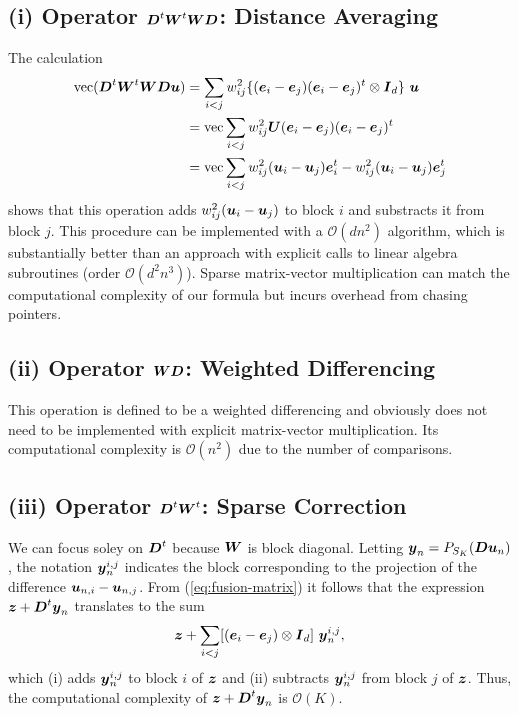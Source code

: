 \documentclass[11pt]{article}
\begin{document}
\subsection*{(i) Operator \(\boldsymbol{D}^{t} \boldsymbol{W}^{t} \boldsymbol{W} \boldsymbol{D}\): Distance Averaging}

The calculation
\begin{align*}
    \mathop{\rm vec}\nolimits(\boldsymbol{D}^{t} \boldsymbol{W}^{t} \boldsymbol{W} \boldsymbol{D} \boldsymbol{u})
    &=
    \sum_{i<j} w_{ij}^{2} \{(\boldsymbol{e}_{i} - \boldsymbol{e}_{j})(\boldsymbol{e}_{i} - \boldsymbol{e}_{j})^{t} \otimes \boldsymbol{I}_{d}\}~\boldsymbol{u} \\
    &=
    \mathop{\rm vec}\nolimits
    \sum_{i<j} w_{ij}^{2} \boldsymbol{U} (\boldsymbol{e}_{i} - \boldsymbol{e}_{j})(\boldsymbol{e}_{i} - \boldsymbol{e}_{j})^{t} \\
    &=
    \mathop{\rm vec}\nolimits
    \sum_{i<j} w_{ij}^{2} (\boldsymbol{u}_{i} - \boldsymbol{u}_{j}) \boldsymbol{e}_{i}^{t} - w_{ij}^{2} (\boldsymbol{u}_{i} - \boldsymbol{u}_{j}) \boldsymbol{e}_{j}^{t}
\end{align*}
shows that this operation adds \(w_{ij}^{2} (\boldsymbol{u}_{i} - \boldsymbol{u}_{j})\) to block \(i\) and substracts it from block \(j\).
This procedure can be implemented with a \(\mathcal{O}(dn^{2})\) algorithm, which is substantially better than an approach with explicit calls to linear algebra subroutines (order \(\mathcal{O}(d^{2}n^{3})\)).
Sparse matrix-vector multiplication can match the computational complexity of our formula but incurs overhead from chasing pointers.

\subsection*{(ii) Operator \(\boldsymbol{W} \boldsymbol{D}\): Weighted Differencing}

This operation is defined to be a weighted differencing and obviously does not need to be implemented with explicit matrix-vector multiplication.
Its computational complexity is \(\mathcal{O}(n^{2})\) due to the number of comparisons.

\subsection*{(iii) Operator \(\boldsymbol{D}^{t} \boldsymbol{W}^{t}\): Sparse Correction}

We can focus soley on \(\boldsymbol{D}^{t}\) because \(\boldsymbol{W}\) is block diagonal.
Letting \(\boldsymbol{y}_{n} = P_{S_{K}}(\boldsymbol{D} \boldsymbol{u}_{n})\), the notation \(\boldsymbol{y}^{i,j}_{n}\) indicates the block corresponding to the projection of the difference \(\boldsymbol{u}_{n,i} - \boldsymbol{u}_{n,j}\).
From (\ref{eq:fusion-matrix}) it follows that the expression \(\boldsymbol{z} + \boldsymbol{D}^{t} \boldsymbol{y}_{n}\) translates to the sum
\begin{equation*}
    \boldsymbol{z} + \sum_{i<j} [(\boldsymbol{e}_{i} - \boldsymbol{e}_{j}) \otimes \boldsymbol{I}_{d}]~\boldsymbol{y}^{i,j}_{n},
\end{equation*}
which (i) adds \(\boldsymbol{y}^{i,j}_{n}\) to block \(i\) of \(\boldsymbol{z}\) and (ii) subtracts \(\boldsymbol{y}^{i,j}_{n}\) from block \(j\) of \(\boldsymbol{z}\).
Thus, the computational complexity of \(\boldsymbol{z} + \boldsymbol{D}^{t} \boldsymbol{y}_{n}\) is \(\mathcal{O}(K)\).
\end{document}
